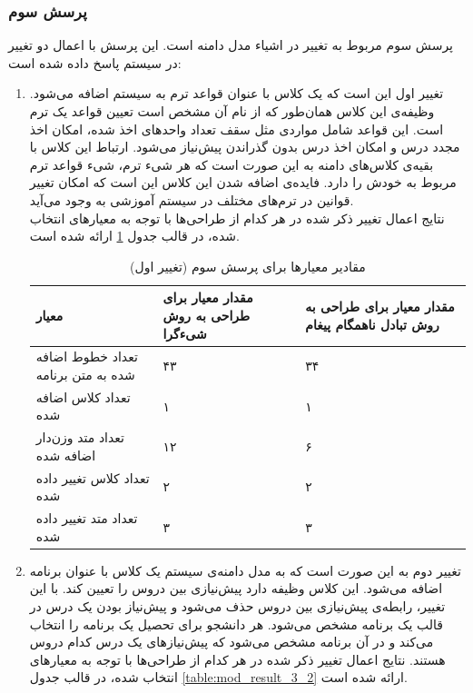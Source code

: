 \subsubsection{پرسش سوم}
پرسش سوم مربوط به تغییر در اشیاء مدل دامنه است. این پرسش با اعمال دو تغییر در سیستم پاسخ داده شده است:
\begin{enumerate}
\item تغییر اول این است که یک کلاس با عنوان قواعد ترم به سیستم اضافه می‌شود. وظیفه‌ی این کلاس همان‌طور که از نام آن مشخص است تعیین قواعد یک ترم است. این قواعد شامل مواردی مثل سقف تعداد واحدهای اخذ شده، امکان اخذ مجدد درس و امکان اخذ درس بدون گذراندن پیش‌نیاز می‌شود. ارتباط این کلاس با بقیه‌ی کلاس‌های دامنه به این صورت است که هر شیء ترم، شیء قواعد ترم مربوط به خودش را دارد. فایده‌ی اضافه شدن این کلاس این است که امکان تغییر قوانین در ترم‌های مختلف در سیستم آموزشی به وجود می‌آید. \\
 نتایج اعمال تغییر ذکر شده در هر کدام از طراحی‌ها با توجه به معیارهای انتخاب شده، در قالب جدول \ref{table:mod_result_3_1} ارائه شده است.




\begin{table}
\small
\begin{center}
\begin{tabular}{|p{7cm}|p{4cm}|p{4cm}|}
	\hline
\textbf{معیار} & \textbf{مقدار معیار برای طراحی به روش شیءگرا} & \textbf{مقدار معیار برای طراحی به روش تبادل ناهمگام پیغام} 
\\ 
	\hline
	تعداد خطوط اضافه شده به متن برنامه
	 &
	 ۴۳
	 &
	 ۳۴
\\
	\hline
	تعداد کلاس اضافه شده
	 &
	 ۱
	 &
	 ۱
\\
	\hline
	تعداد متد وزن‌دار اضافه شده
	 &
	 ۱۲
	 &
	 ۶
\\
	\hline

	تعداد کلاس تغییر داده شده
	 &
	۲
	 &
	 ۲
\\
	\hline

	تعداد متد تغییر داده شده
	 &
	۳
	 &
	 ۳
\\
	\hline

\end{tabular}
\caption{\label{table:mod_result_3_1} مقادیر معیارها برای پرسش سوم (تغییر اول)}
\end{center}
\end{table}



\item تغییر دوم به این صورت است که به مدل دامنه‌ی سیستم یک کلاس با عنوان برنامه اضافه می‌شود. این کلاس وظیفه دارد پیش‌نیازی بین دروس را تعیین کند. با این تغییر، رابطه‌ی پیش‌نیازی بین دروس حذف می‌شود و پیش‌نیاز بودن یک درس در قالب یک برنامه مشخص می‌شود. هر دانشجو برای تحصیل یک برنامه را انتخاب می‌کند و در آن برنامه مشخص می‌شود که پیش‌نیازهای یک درس کدام دروس هستند.
 نتایج اعمال تغییر ذکر شده در هر کدام از طراحی‌ها با توجه به معیارهای انتخاب شده، در قالب جدول \ref{table:mod_result_3_2} ارائه شده است.


\end{enumerate}
